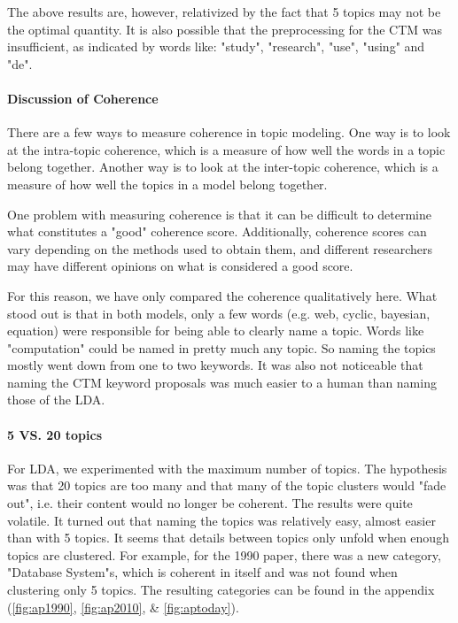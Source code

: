 \documentclass[fleqn,10pt]{SelfArx} %
\begin{document}
The above results are, however, relativized by the fact that 5 topics may not be the optimal quantity. It is also possible that the preprocessing for the CTM was insufficient, as indicated by words like: "study", "research", "use", "using" and "de".

\paragraph{Discussion of Coherence}

There are a few ways to measure coherence in topic modeling. One way is to look at the intra-topic coherence, which is a measure of how well the words in a topic belong together. Another way is to look at the inter-topic coherence, which is a measure of how well the topics in a model belong together.

One problem with measuring coherence is that it can be difficult to determine what constitutes a "good" coherence score. Additionally, coherence scores can vary depending on the methods used to obtain them, and different researchers may have different opinions on what is considered a good score.

For this reason, we have only compared the coherence qualitatively here. What stood out is that in both models, only a few words (e.g. web, cyclic, bayesian, equation) were responsible for being able to clearly name a topic. Words like "computation" could be named in pretty much any topic. So naming the topics mostly went down from one to two keywords. It was also not noticeable that naming the CTM keyword proposals was much easier to a human than naming those of the LDA. 

\paragraph{5 VS. 20 topics} For LDA, we experimented with the maximum number of topics. The hypothesis was that 20 topics are too many and that many of the topic clusters would "fade out", i.e. their content would no longer be coherent. The results were quite volatile. It turned out that naming the topics was relatively easy, almost easier than with 5 topics. It seems that details between topics only unfold when enough topics are clustered. For example, for the 1990 paper, there was a new category, "Database System"s, which is coherent in itself and was not found when clustering only 5 topics. The resulting categories can be found in the appendix (\ref{fig:ap1990}, \ref{fig:ap2010}, \& \ref{fig:aptoday}).
\end{document}
